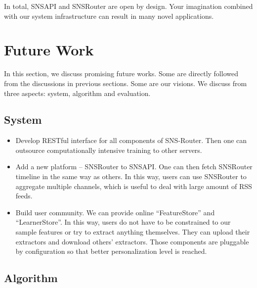 \documentclass{sig-alternate}
\begin{document}
In total, SNSAPI and SNSRouter are open by design. 
Your imagination combined with our system infrastructure can result in many novel applications. 

\section{Future Work}
\label{sec:Future Work}

In this section, we discuss promising future works. 
Some are directly followed from the discussions in previous sections. 
Some are our visions. 
We discuss from three aspects: system, algorithm and evaluation. 

\subsection{System}
\label{sec:fu_System}

\begin{itemize}
	\item Develop RESTful interface for all components of SNS-Router.
		Then one can outsource computationally intensive training to other servers. 
	\item Add a new platform -- SNSRouter to SNSAPI.
		One can then fetch SNSRouter timeline in the same way as others. 
		In this way, users can use SNSRouter to aggregate multiple channels,
		which is useful to deal with large amount of RSS feeds. 
	\item Build user community.
		We can provide online ``FeatureStore'' and ``LearnerStore''. 
		In this way, users do not have to be constrained to our sample features
		or try to extract anything themselves. 
		They can upload their extractors and download others' extractors. 
		Those components are pluggable by configuration 
		so that better personalization level is reached. 
\end{itemize}

\subsection{Algorithm}
\label{sec:fu_Algorithm}
\end{document}
